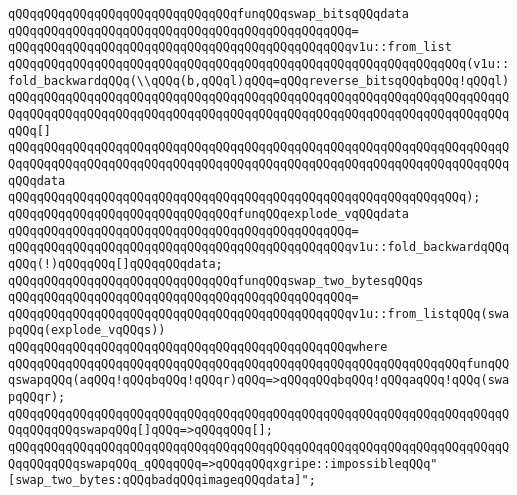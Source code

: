 \newline
\verb|qQQqqQQqqQQqqQQqqQQqqQQqqQQqqQQqfunqQQqswap_bitsqQQqdata|\newline
\verb|qQQqqQQqqQQqqQQqqQQqqQQqqQQqqQQqqQQqqQQqqQQqqQQq=|\newline
\verb|qQQqqQQqqQQqqQQqqQQqqQQqqQQqqQQqqQQqqQQqqQQqqQQqv1u::from_list|\newline
\verb|qQQqqQQqqQQqqQQqqQQqqQQqqQQqqQQqqQQqqQQqqQQqqQQqqQQqqQQqqQQqqQQq(v1u::fold_backwardqQQq(\\qQQq(b,qQQql)qQQq=qQQqreverse_bitsqQQqbqQQq!qQQql)|\newline
\verb|qQQqqQQqqQQqqQQqqQQqqQQqqQQqqQQqqQQqqQQqqQQqqQQqqQQqqQQqqQQqqQQqqQQqqQQqqQQqqQQqqQQqqQQqqQQqqQQqqQQqqQQqqQQqqQQqqQQqqQQqqQQqqQQqqQQqqQQqqQQqqQQq[]|\newline
\verb|qQQqqQQqqQQqqQQqqQQqqQQqqQQqqQQqqQQqqQQqqQQqqQQqqQQqqQQqqQQqqQQqqQQqqQQqqQQqqQQqqQQqqQQqqQQqqQQqqQQqqQQqqQQqqQQqqQQqqQQqqQQqqQQqqQQqqQQqqQQqqQQqdata|\newline
\verb|qQQqqQQqqQQqqQQqqQQqqQQqqQQqqQQqqQQqqQQqqQQqqQQqqQQqqQQqqQQqqQQq);|\newline
\newline
\verb|qQQqqQQqqQQqqQQqqQQqqQQqqQQqqQQqfunqQQqexplode_vqQQqdata|\newline
\verb|qQQqqQQqqQQqqQQqqQQqqQQqqQQqqQQqqQQqqQQqqQQqqQQq=|\newline
\verb|qQQqqQQqqQQqqQQqqQQqqQQqqQQqqQQqqQQqqQQqqQQqqQQqv1u::fold_backwardqQQqqQQq(!)qQQqqQQq[]qQQqqQQqdata;|\newline
\newline
\verb|qQQqqQQqqQQqqQQqqQQqqQQqqQQqqQQqfunqQQqswap_two_bytesqQQqs|\newline
\verb|qQQqqQQqqQQqqQQqqQQqqQQqqQQqqQQqqQQqqQQqqQQqqQQq=|\newline
\verb|qQQqqQQqqQQqqQQqqQQqqQQqqQQqqQQqqQQqqQQqqQQqqQQqv1u::from_listqQQq(swapqQQq(explode_vqQQqs))|\newline
\verb|qQQqqQQqqQQqqQQqqQQqqQQqqQQqqQQqqQQqqQQqqQQqqQQqwhere|\newline
\verb|qQQqqQQqqQQqqQQqqQQqqQQqqQQqqQQqqQQqqQQqqQQqqQQqqQQqqQQqqQQqqQQqfunqQQqswapqQQq(aqQQq!qQQqbqQQq!qQQqr)qQQq=>qQQqqQQqbqQQq!qQQqaqQQq!qQQq(swapqQQqr);|\newline
\verb|qQQqqQQqqQQqqQQqqQQqqQQqqQQqqQQqqQQqqQQqqQQqqQQqqQQqqQQqqQQqqQQqqQQqqQQqqQQqqQQqswapqQQq[]qQQq=>qQQqqQQq[];|\newline
\verb|qQQqqQQqqQQqqQQqqQQqqQQqqQQqqQQqqQQqqQQqqQQqqQQqqQQqqQQqqQQqqQQqqQQqqQQqqQQqqQQqswapqQQq_qQQqqQQq=>qQQqqQQqxgripe::impossibleqQQq"[swap_two_bytes:qQQqbadqQQqimageqQQqdata]";|\newline
